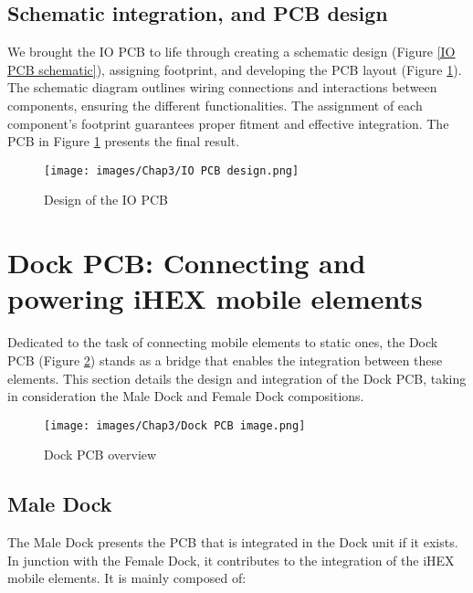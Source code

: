 \subsection{Schematic integration, and PCB design}
We brought the IO PCB to life through creating a schematic design (Figure \ref{IO PCB schematic}), assigning footprint, and developing the PCB layout (Figure \ref{IO PCB design}). The schematic diagram outlines wiring connections and interactions between components, ensuring the different functionalities. The assignment of each component's footprint guarantees proper fitment and effective integration. The PCB in Figure \ref{IO PCB design} presents the final result.

\begin{figure}[H]
\begin{center}
\texttt{[image: images/Chap3/IO PCB design.png]}\\
\caption{Design of the IO PCB}
\label{IO PCB design}
\end{center}
\end{figure}

\section{Dock PCB: Connecting and powering iHEX mobile elements}

Dedicated to the task of connecting mobile elements to static ones, the Dock PCB (Figure \ref{Dock PCB overview}) stands as a bridge that enables the integration between these elements. This section details the design and integration of the Dock PCB, taking in consideration the Male Dock and Female Dock compositions.

\begin{figure}[H]
\begin{center}
\texttt{[image: images/Chap3/Dock PCB image.png]}\\
\caption{Dock PCB overview}
\label{Dock PCB overview}
\end{center}
\end{figure}

\subsection{Male Dock}
The Male Dock presents the PCB that is integrated in the Dock unit if it exists. In junction with the Female Dock, it contributes to the integration of the iHEX mobile elements. It is mainly composed of:

